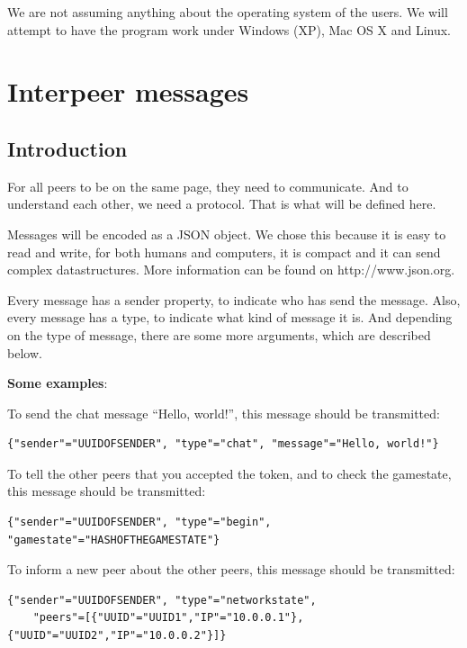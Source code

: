 \documentclass[a4paper,twoside,11pt]{article}
\begin{document}
We are not assuming anything about the operating system of the users. We will attempt to have the program work under Windows (XP), Mac OS X and Linux.



\section{Interpeer messages}
\subsection{Introduction}
For all peers to be on the same page, they need to communicate. And to understand each other, we need a protocol. That is what will be defined here.

Messages will be encoded as a JSON object. We chose this because it is easy to read and write, for both humans and computers, it is compact and it can send complex datastructures. More information can be found on http://www.json.org.

Every message has a sender property, to indicate who has send the message. Also, every message has a type, to indicate what kind of message it is. And depending on the type of message, there are some more arguments, which are described below.

\textbf{Some examples}:

To send the chat message ``Hello, world!'', this message should be transmitted:
\begin{verbatim}
{"sender"="UUIDOFSENDER", "type"="chat", "message"="Hello, world!"}
\end{verbatim}

To tell the other peers that you accepted the token, and to check the gamestate, this message should be transmitted:
\begin{verbatim}
{"sender"="UUIDOFSENDER", "type"="begin", "gamestate"="HASHOFTHEGAMESTATE"}
\end{verbatim}

To inform a new peer about the other peers, this message should be transmitted:
\begin{verbatim}
{"sender"="UUIDOFSENDER", "type"="networkstate", 
    "peers"=[{"UUID"="UUID1","IP"="10.0.0.1"}, {"UUID"="UUID2","IP"="10.0.0.2"}]}
\end{verbatim}
\end{document}
